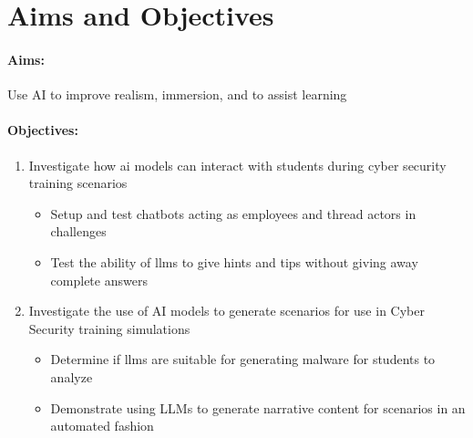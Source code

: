 \chapter{Aims and Objectives}
\subsubsection*{Aims:}
Use AI to improve realism, immersion, and to assist learning

\subsubsection{Objectives:}
\begin{enumerate}
    \item Investigate how \acrshort{ai} models can interact with students during cyber security training scenarios
    \begin{itemize}
        \item Setup and test chatbots acting as employees and thread actors in challenges
        \item Test the ability of \acrshort{llm}s to give hints and tips without giving away complete answers
    \end{itemize}
    \item Investigate the use of AI models to generate scenarios for use in Cyber Security training simulations
    \begin{itemize}
        \item Determine if \acrshort{llm}s are suitable for generating malware for students to analyze
        \item Demonstrate using LLMs to generate narrative content for scenarios in an automated fashion
    \end{itemize}
\end{enumerate}